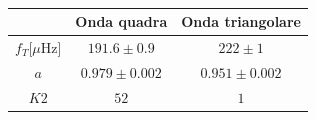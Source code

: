 \documentclass{article}
\begin{document}
        \begin{table}[H]
            \centering
            \begin{tabular}{ccc}
                \hline
                            &Onda quadra        & Onda triangolare\\
                \hline
                $f_T$[$\mu$Hz]  &$191.6\pm0.9$      & $222\pm1$\\
                $a$         &$0.979\pm0.002$    &   $0.951\pm0.002$\\
                $K2$        & $52   $             &   $1$ \\
            
                \hline
            \end{tabular}
            \caption{}
            \label{tab:results}
        \end{table}
\end{document}
